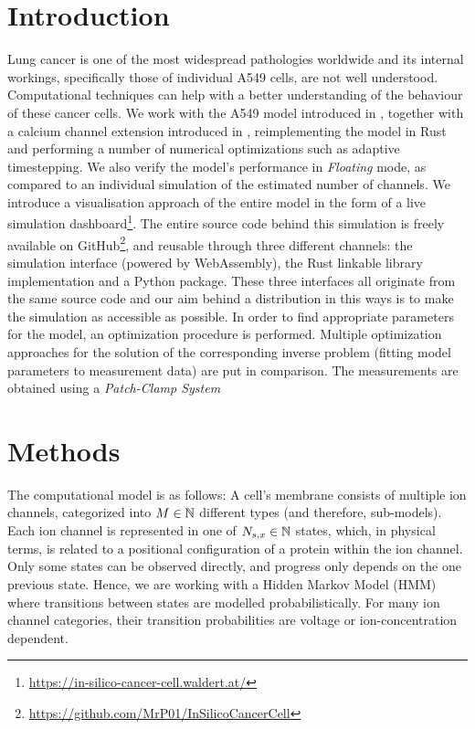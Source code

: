 \documentclass[USenglish,twocolumn]{article}
\begin{document}
  \section{Introduction}
  Lung cancer is one of the most widespread pathologies worldwide and its internal workings, specifically those of individual A549 cells, are not well understood.
  Computational techniques can help with a better understanding of the behaviour of these cancer cells.
  We work with the A549 model introduced in \cite{2021-A549-model}, together with a calcium channel extension introduced in \cite{2024-calcium-channels}, reimplementing the model in Rust and performing a number of numerical optimizations such as adaptive timestepping.
  We also verify the model's performance in \textit{Floating} mode, as compared to an individual simulation of the estimated number of channels.
  We introduce a visualisation approach of the entire model in the form of a live simulation dashboard\footnote{\url{https://in-silico-cancer-cell.waldert.at/}}.
  The entire source code behind this simulation is freely available on GitHub\footnote{\url{https://github.com/MrP01/InSilicoCancerCell}}, and reusable through three different channels: the simulation interface (powered by WebAssembly), the Rust linkable library implementation and a Python package.
  These three interfaces all originate from the same source code and our aim behind a distribution in this ways is to make the simulation as accessible as possible.
  In order to find appropriate parameters for the model, an optimization procedure is performed.
  Multiple optimization approaches for the solution of the corresponding inverse problem (fitting model parameters to measurement data) are put in comparison.
  The measurements are obtained using a \textit{Patch-Clamp System}

  \section{Methods}
  The computational model is as follows:
  A cell's membrane consists of multiple ion channels, categorized into $M \in \mathbb{N}$ different types (and therefore, sub-models).
  Each ion channel is represented in one of $N_{s, x} \in \mathbb{N}$ states, which, in physical terms, is related to a positional configuration of a protein within the ion channel.
  Only some states can be observed directly, and progress only depends on the one previous state.
  Hence, we are working with a Hidden Markov Model (HMM) where transitions between states are modelled probabilistically.
  For many ion channel categories, their transition probabilities are voltage or ion-concentration dependent.
\end{document}
